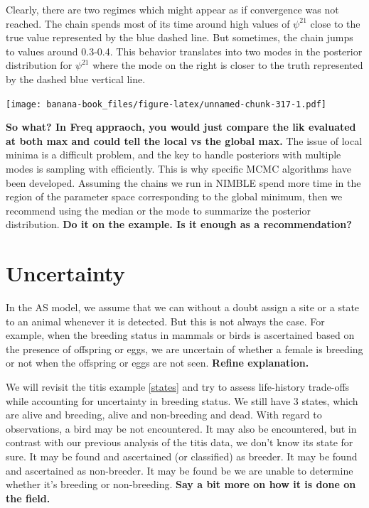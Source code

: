 \documentclass[
  12pt,
]{krantz}
\begin{document}
Clearly, there are two regimes which might appear as if convergence was not reached. The chain spends most of its time around high values of \(\psi^{21}\) close to the true value represented by the blue dashed line. But sometimes, the chain jumps to values around 0.3-0.4. This behavior translates into two modes in the posterior distribution for \(\psi^{21}\) where the mode on the right is closer to the truth represented by the dashed blue vertical line.

\texttt{[image: banana-book\_files/figure-latex/unnamed-chunk-317-1.pdf]}

\textbf{So what? In Freq appraoch, you would just compare the lik evaluated at both max and could tell the local vs the global max.} The issue of local minima is a difficult problem, and the key to handle posteriors with multiple modes is sampling with efficiently. This is why specific MCMC algorithms have been developed. Assuming the chains we run in NIMBLE spend more time in the region of the parameter space corresponding to the global minimum, then we recommend using the median or the mode to summarize the posterior distribution. \textbf{Do it on the example. Is it enough as a recommendation?}

\hypertarget{multievent}{%
\section{Uncertainty}\label{multievent}}

In the AS model, we assume that we can without a doubt assign a site or a state to an animal whenever it is detected. But this is not always the case. For example, when the breeding status in mammals or birds is ascertained based on the presence of offspring or eggs, we are uncertain of whether a female is breeding or not when the offspring or eggs are not seen. \textbf{Refine explanation.}

We will revisit the titis example \ref{states} and try to assess life-history trade-offs while accounting for uncertainty in breeding status. We still have 3 states, which are alive and breeding, alive and non-breeding and dead. With regard to observations, a bird may be not encountered. It may also be encountered, but in contrast with our previous analysis of the titis data, we don't know its state for sure. It may be found and ascertained (or classified) as breeder. It may be found and ascertained as non-breeder. It may be found be we are unable to determine whether it's breeding or non-breeding. \textbf{Say a bit more on how it is done on the field.}
\end{document}
